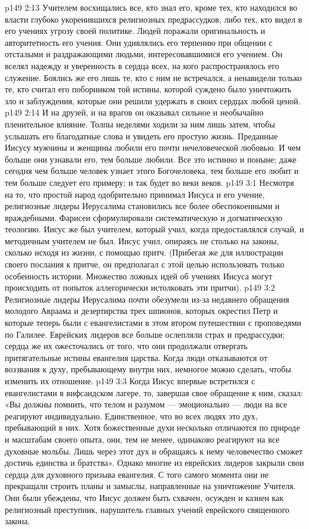 \vs p149 2:13 Учителем восхищались все, кто знал его, кроме тех, кто находился во власти глубоко укоренившихся религиозных предрассудков, либо тех, кто видел в его учениях угрозу своей политике. Людей поражали оригинальность и авторитетность его учения. Они удивлялись его терпению при общении с отсталыми и раздражающими людьми, интересовавшимися его учением. Он вселял надежду и уверенность в сердца всех, на кого распространялось его служение. Боялись же его лишь те, кто с ним не встречался, а ненавидели только те, кто считал его поборником той истины, которой суждено было уничтожить зло и заблуждения, которые они решили удержать в своих сердцах любой ценой.
\vs p149 2:14 И на друзей, и на врагов он оказывал сильное и необычайно пленительное влияние. Толпы неделями ходили за ним лишь затем, чтобы услышать его благодатные слова и увидеть его простую жизнь. Преданные Иисусу мужчины и женщины любили его почти нечеловеческой любовью. И чем больше они узнавали его, тем больше любили. Все это истинно и поныне; даже сегодня чем больше человек узнает этого Богочеловека, тем больше его любит и тем больше следует его примеру; и так будет во веки веков.
\vs p149 3:1 Несмотря на то, что простой народ одобрительно принимал Иисуса и его учение, религиозные лидеры Иерусалима становились все более обеспокоенными и враждебными. Фарисеи сформулировали систематическую и догматическую теологию. Иисус же был учителем, который учил, когда предоставлялся случай, и методичным учителем не был. Иисус учил, опираясь не столько на законы, сколько исходя из жизни, с помощью притч. (Прибегая же для иллюстрации своего послания к притче, он предполагал с этой целью использовать только  особенность истории. Множество ложных идей об учениях Иисуса могут происходить от попыток аллегорически истолковать эти притчи).
\vs p149 3:2 Религиозные лидеры Иерусалима почти обезумели из\hyp{}за недавнего обращения молодого Авраама и дезертирства трех шпионов, которых окрестил Петр и которые теперь были с евангелистами в этом втором путешествии с проповедями по Галилее. Еврейских лидеров все больше ослепляли страх и предрассудки; сердца же их ожесточались от того, что они продолжали отвергать притягательные истины евангелия царства. Когда люди отказываются от воззвания к духу, пребывающему внутри них, немногое можно сделать, чтобы изменить их отношение.
\vs p149 3:3 Когда Иисус впервые встретился с евангелистами в вифсаидском лагере, то, завершая свое обращение к ним, сказал: «Вы должны помнить, что телом и разумом --- эмоционально --- люди на все реагируют индивидуально. Единственное, что во всех людях  это дух, пребывающий в них. Хотя божественные духи несколько отличаются по природе и масштабам своего опыта, они, тем не менее, одинаково реагируют на все духовные мольбы. Лишь через этот дух и обращаясь к нему человечество сможет достичь единства и братства». Однако многие из еврейских лидеров закрыли свои сердца для духовного призыва евангелия. С того самого момента они не прекращали строить планы и замыслы, направленные на уничтожение Учителя. Они были убеждены, что Иисус должен быть схвачен, осужден и казнен как религиозный преступник, нарушитель главных учений еврейского священного закона.
